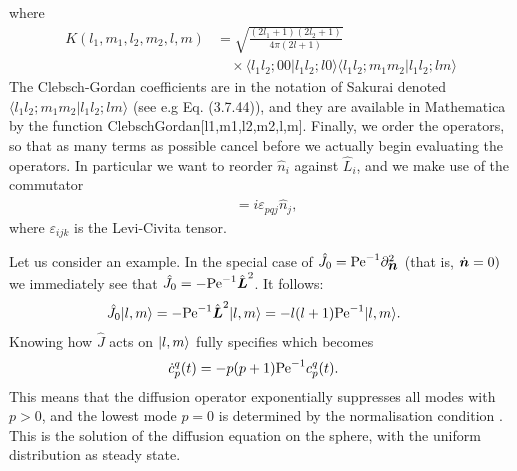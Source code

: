 \documentclass[thesis.tex]{subfiles}
\begin{document}
where
\begin{align*}
	K(l_1, m_1, l_2, m_2, l, m) &= \sqrt{\frac{(2l_1+1)(2l_2+1)}{4\pi (2l+1)}} \\
	&\quad \times \langle l_1 l_2; 0 0|l_1l_2;l0\rangle
	\langle l_1 l_2; m_1 m_2|l_1l_2;lm\rangle
\end{align*}
The Clebsch-Gordan coefficients are in the notation of Sakurai denoted $\langle l_1 l_2; m_1 m_2|l_1l_2;lm\rangle$ (see e.g Eq. (3.7.44)), and they are available in Mathematica by the function {ClebschGordan[{l1,m1},{l2,m2},{l,m}]}. Finally, we order the operators, so that as many terms as possible cancel before we actually begin evaluating the operators.
In particular we want to reorder $\hat{n}_i$ against $\hat{L}_i$, and we make use of the commutator
\begin{align*}
	[\hat{n}_p, \hat{L}_q] &= i\varepsilon_{pqj}\hat{n}_j,
\end{align*}
where $\varepsilon_{ijk}$ is the Levi-Civita tensor.

Let us consider an example. In the special case of $\hat J_0 = \mbox{Pe}^{-1} \partial_{\mbox{\boldmath$n$}}^2$ (that is, $\dot{\mbox{\boldmath$n$}}=0)$ we immediately see that $\hat J_0=-\mbox{Pe}^{-1} \hat{\mbox{\boldmath$L$}}^2$. It follows:
\begin{align*}
	\hat J_0 |l,m\rangle&=-\mbox{Pe}^{-1}\hat{\mbox{\boldmath$L$}}^2 |l,m\rangle = -l(l+1)\mbox{Pe}^{-1}|l,m\rangle.
\end{align*}
Knowing how $\hat J$ acts on $|l,m\rangle$ fully specifies  which becomes
\begin{align*}
	\dot c_p^q(t)  &= -p(p+1)\mbox{Pe}^{-1}c_p^q(t).
\end{align*}
This means that the diffusion operator exponentially suppresses all modes with $p>0$, and the lowest mode $p=0$ is determined by the normalisation condition . This is the solution of the diffusion equation on the sphere, with the uniform distribution as steady state.
\end{document}
